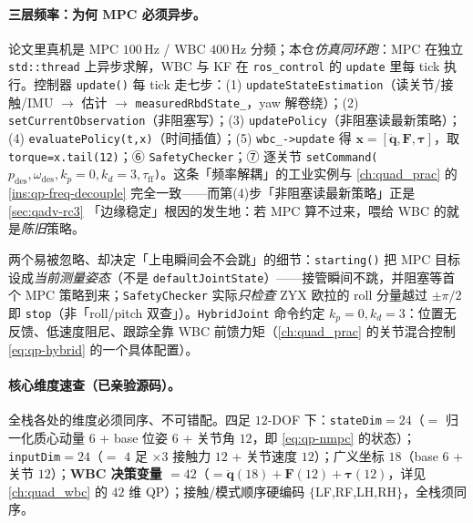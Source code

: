 \paragraph{三层频率：为何 MPC 必须异步。}
论文里真机是 MPC $100$\,Hz / WBC $400$\,Hz 分频；本仓\emph{仿真同环跑}：MPC 在独立 \texttt{std::thread} 上异步求解，WBC 与 KF 在 \texttt{ros\_control} 的 \texttt{update} 里每 tick 执行。控制器 \texttt{update()} 每 tick 走七步\cite{sleiman2021unified}：(1) \texttt{updateStateEstimation}（读关节/接触/IMU $\to$ 估计 $\to$ \texttt{measuredRbdState\_}，yaw 解卷绕）；(2) \texttt{setCurrentObservation}（非阻塞写）；(3) \texttt{updatePolicy}（非阻塞读最新策略）；(4) \texttt{evaluatePolicy(t,x)}（时间插值）；(5) \texttt{wbc\_->update} 得 $\boldsymbol{x}=[\ddot{\boldsymbol{q}},\boldsymbol{F},\boldsymbol{\tau}]$，取 \texttt{torque=x.\allowbreak tail(12)}；⑥ \texttt{SafetyChecker}；⑦ 逐关节 \texttt{setCommand($p_{\mathrm{des}},\omega_{\mathrm{des}},k_p{=}0,k_d{=}3,\tau_{\mathrm{ff}}$)}。这条「频率解耦」的工业实例与 \cref{ch:quad_prac} 的 \cref{ins:qp-freq-decouple} 完全一致——而第(4)步「非阻塞读最新策略」正是 \cref{sec:qadv-rc3} 「边缘稳定」根因的发生地：若 MPC 算不过来，喂给 WBC 的就是\emph{陈旧}策略。

\begin{note}[控制器接管的两个安全细节]
两个易被忽略、却决定「上电瞬间会不会跳」的细节：\texttt{starting()} 把 MPC 目标设成\emph{当前测量姿态}（不是 \texttt{defaultJointState}）——接管瞬间不跳，并阻塞等首个 MPC 策略到来；\texttt{SafetyChecker} 实际\emph{只检查} ZYX 欧拉的 roll 分量越过 $\pm\pi/2$ 即 \texttt{stop}（非「roll/pitch 双查」）。\texttt{HybridJoint} 命令约定 $k_p{=}0,k_d{=}3$：位置无反馈、低速度阻尼、跟踪全靠 WBC 前馈力矩（\cref{ch:quad_prac} 的关节混合控制 \cref{eq:qp-hybrid} 的一个具体配置）。
\end{note}

\paragraph{核心维度速查（已亲验源码）。}
全栈各处的维度必须同序、不可错配。四足 $12$-DOF 下：\texttt{stateDim}$=24$（$=$ 归一化质心动量 $6$ + base 位姿 $6$ + 关节角 $12$，即 \cref{eq:qp-nmpc} 的状态）；\texttt{inputDim}$=24$（$=$ $4$ 足 $\times3$ 接触力 $12$ + 关节速度 $12$）；广义坐标 $18$（base $6$ + 关节 $12$）；\textbf{WBC 决策变量 $=42$}（$=\ddot{\boldsymbol{q}}(18)+\boldsymbol{F}(12)+\boldsymbol{\tau}(12)$，详见 \cref{ch:quad_wbc} 的 $42$ 维 QP）；接触/模式顺序硬编码 $\{$LF,RF,LH,RH$\}$，全栈须同序。

